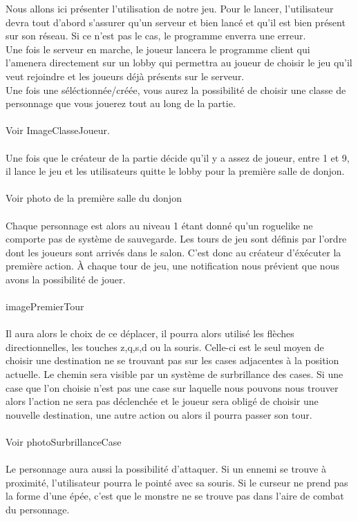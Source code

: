 \documentclass[a4paper, 12pt]{article}
\begin{document}
Nous allons ici présenter l'utilisation de notre jeu.
Pour le lancer, l'utilisateur devra tout d'abord s'assurer qu'un serveur et bien lancé et qu'il est bien présent sur son réseau. Si ce n'est pas le cas, le programme enverra une erreur.
\\
Une fois le serveur en marche, le joueur lancera le programme client qui l'amenera directement sur un lobby qui permettra au joueur de choisir le jeu qu'il veut rejoindre et les joueurs déjà présents sur le serveur. 
\\
Une fois une séléctionnée/créée, vous aurez la possibilité de choisir une classe de personnage que vous jouerez tout au long de la partie.
\\
\\
Voir ImageClasseJoueur.
\\
\\
Une fois que le créateur de la partie décide qu'il y a assez de joueur, entre 1 et 9, il lance le jeu et les utilisateurs quitte le lobby pour la première salle de donjon.
\\
\\
Voir photo de la première salle du donjon
\\
\\
Chaque personnage est alors au niveau 1 étant donné qu'un roguelike  ne comporte pas de système de sauvegarde. 
Les tours de jeu sont définis par l'ordre dont les joueurs sont arrivés dans le salon. C'est donc au créateur d'éxécuter la première action. À chaque tour de jeu, une notification nous prévient que nous avons la possibilité de jouer.
\\
\\
imagePremierTour
\\
\\
Il aura alors le choix de ce déplacer, il pourra alors utilisé les flèches directionnelles, les touches z,q,s,d ou la souris. Celle-ci est le seul moyen de choisir une destination ne se trouvant pas sur les cases adjacentes à la position actuelle. Le chemin sera visible par un système de surbrillance des cases. Si une case que l'on choisie n'est pas une case sur laquelle nous pouvons nous trouver alors l'action ne sera pas déclenchée et le joueur sera obligé de choisir une nouvelle destination, une autre action ou alors il pourra passer son tour.
\\
\\
Voir photoSurbrillanceCase
\\
\\
Le personnage aura aussi la possibilité d'attaquer. Si un ennemi se trouve à proximité, l'utilisateur pourra le pointé avec sa souris. Si le curseur ne prend pas la forme d'une épée, c'est que le monstre ne se trouve pas dans l'aire de combat du personnage.
\end{document}
